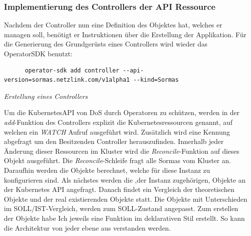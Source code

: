 \documentclass[a4paper,11pt]{article}
\begin{document}
      \subsubsection{Implementierung des Controllers der API Ressource}
      Nachdem der Controller nun eine Definition des Objektes hat, welches er managen soll, benötigt er 
      Instruktionen über die Erstellung der Applikation. Für die Generierung des Grundgerüsts eines Controllers
      wird wieder das OperatorSDK benutzt:
      \begin{lstlisting}
      operator-sdk add controller --api-version=sormas.netzlink.com/v1alpha1 --kind=Sormas
      \end{lstlisting} 
      \emph{Erstellung eines Controllers}

      Um die KubernetesAPI von DoS durch Operatoren zu schützen, werden in der \emph{add}-Funktion
      des Controllers explizit die Kubernetesressourcen genannt, auf welchen ein \emph{WATCH} Aufruf 
      ausgeführt wird. Zusätzlich wird eine Kennung abgefragt um den Besitzenden Controller herauszufinden.
      \newline
      Innerhalb jeder Änderung dieser Ressourcen im Kluster wird die \emph{Reconcile}-Funktion auf dieses Objekt 
      ausgeführt. Die \emph{Reconcile}-Schleife fragt alle Sormas vom Kluster an. Daraufhin werden die Objekte berechnet,
      welche für diese Instanz zu konfigurieren sind. Als nächstes werden die ,der Instanz zugehörigen, Objekte an der Kubernetes
      API angefragt. Danach findet ein  Vergleich der theoretischen Objekte und der real existierenden Objekte statt.
      Die Objekte mit Unterschieden im SOLL/IST-Vergleich, werden zum SOLL-Zustand angepasst.
      \newline
      Zum erstellen der Objekte habe Ich jeweils eine Funktion im deklarativen Stil erstellt.
      So kann die Architektur von jeder ebene aus verstanden werden.
\end{document}
